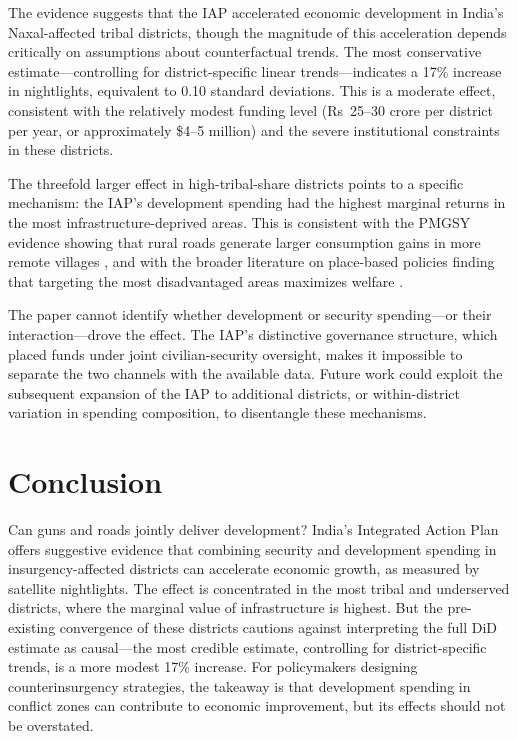\documentclass[12pt]{article}
\begin{document}
The evidence suggests that the IAP accelerated economic development in India's Naxal-affected tribal districts, though the magnitude of this acceleration depends critically on assumptions about counterfactual trends. The most conservative estimate---controlling for district-specific linear trends---indicates a 17\% increase in nightlights, equivalent to 0.10 standard deviations. This is a moderate effect, consistent with the relatively modest funding level (Rs~25--30 crore per district per year, or approximately \$4--5 million) and the severe institutional constraints in these districts.

The threefold larger effect in high-tribal-share districts points to a specific mechanism: the IAP's development spending had the highest marginal returns in the most infrastructure-deprived areas. This is consistent with the PMGSY evidence showing that rural roads generate larger consumption gains in more remote villages \citep{asher2020}, and with the broader literature on place-based policies finding that targeting the most disadvantaged areas maximizes welfare \citep{kline2013}.

The paper cannot identify whether development or security spending---or their interaction---drove the effect. The IAP's distinctive governance structure, which placed funds under joint civilian-security oversight, makes it impossible to separate the two channels with the available data. Future work could exploit the subsequent expansion of the IAP to additional districts, or within-district variation in spending composition, to disentangle these mechanisms.

\section{Conclusion}

Can guns and roads jointly deliver development? India's Integrated Action Plan offers suggestive evidence that combining security and development spending in insurgency-affected districts can accelerate economic growth, as measured by satellite nightlights. The effect is concentrated in the most tribal and underserved districts, where the marginal value of infrastructure is highest. But the pre-existing convergence of these districts cautions against interpreting the full DiD estimate as causal---the most credible estimate, controlling for district-specific trends, is a more modest 17\% increase. For policymakers designing counterinsurgency strategies, the takeaway is that development spending in conflict zones can contribute to economic improvement, but its effects should not be overstated.
\end{document}
